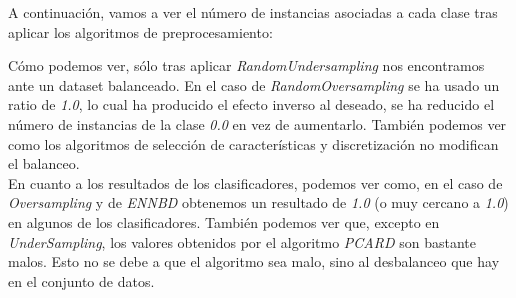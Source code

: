 \documentclass[11pt]{article}
\begin{document}
A continuación, vamos a ver el número de instancias asociadas a cada clase tras aplicar los algoritmos de preprocesamiento:

\begin{table}[H]
	\centering
\end{table}

Cómo podemos ver, sólo tras aplicar \textit{RandomUndersampling} nos encontramos ante un dataset balanceado. En el caso de \textit{RandomOversampling} se ha usado un ratio de \textit{1.0}, lo cual ha producido el efecto inverso al deseado, se ha reducido el número de instancias de la clase \textit{0.0} en vez de aumentarlo. También podemos ver como los algoritmos de selección de características y discretización no modifican el balanceo. \\

En cuanto a los resultados de los clasificadores, podemos ver como, en el caso de \textit{Oversampling} y de \textit{ENNBD} obtenemos un resultado de \textit{1.0} (o muy cercano a \textit{1.0}) en algunos de los clasificadores. También podemos ver que, excepto en \textit{UnderSampling}, los valores obtenidos por el algoritmo \textit{PCARD} son bastante malos. Esto no se debe a que el algoritmo sea malo, sino al desbalanceo que hay en el conjunto de datos.
\end{document}
